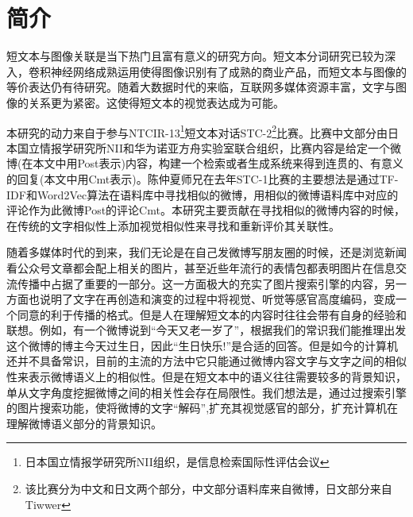 \chapter{简介}
短文本与图像关联是当下热门且富有意义的研究方向。短文本分词研究已较为深入，卷积神经网络成熟运用使得图像识别有了成熟的商业产品，而短文本与图像的等价表达仍有待研究。随着大数据时代的来临，互联网多媒体资源丰富，文字与图像的关系更为紧密。这使得短文本的视觉表达成为可能。

本研究的动力来自于参与NTCIR-13\footnote{日本国立情报学研究所NII组织，是信息检索国际性评估会议}短文本对话STC-2\footnote{该比赛分为中文和日文两个部分，中文部分语料库来自微博，日文部分来自Tiwwer }比赛。比赛中文部分由日本国立情报学研究所NII和华为诺亚方舟实验室联合组织，比赛内容是给定一个微博(在本文中用Post表示)内容，构建一个检索或者生成系统来得到连贯的、有意义的回复(本文中用Cmt表示)。陈仲夏师兄在去年STC-1比赛的主要想法是通过TF-IDF和Word2Vec算法在语料库中寻找相似的微博，用相似的微博语料库中对应的评论作为此微博Post的评论Cmt。本研究主要贡献在寻找相似的微博内容的时候，在传统的文字相似性上添加视觉相似性来寻找和重新评价其关联性。

随着多媒体时代的到来，我们无论是在自己发微博写朋友圈的时候，还是浏览新闻看公众号文章都会配上相关的图片，甚至近些年流行的表情包都表明图片在信息交流传播中占据了重要的一部分。这一方面极大的充实了图片搜索引擎的内容，另一方面也说明了文字在再创造和演变的过程中将视觉、听觉等感官高度编码，变成一个同意的利于传播的格式。但是人在理解短文本的内容时往往会带有自身的经验和联想。例如，有一个微博说到“今天又老一岁了”，根据我们的常识我们能推理出发这个微博的博主今天过生日，因此“生日快乐!”是合适的回答。但是如今的计算机还并不具备常识，目前的主流的方法中它只能通过微博内容文字与文字之间的相似性来表示微博语义上的相似性。但是在短文本中的语义往往需要较多的背景知识，单从文字角度挖掘微博之间的相关性会存在局限性。我们想法是，通过过搜索引擎的图片搜索功能，使将微博的文字“解码”,扩充其视觉感官的部分，扩充计算机在理解微博语义部分的背景知识。



